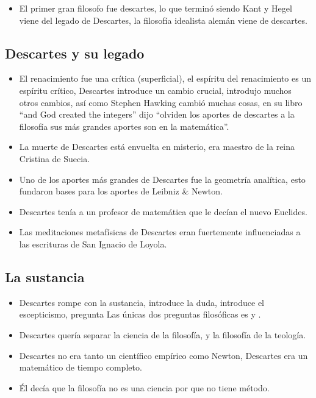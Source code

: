 \begin{itemize}
    \item El primer gran filosofo fue descartes,  lo que terminó siendo Kant y Hegel viene del legado de Descartes, la filosofía idealista alemán viene de descartes. 
\end{itemize}

\subsection{Descartes y su legado}
\begin{itemize}
    \item El renacimiento fue una crítica (superficial), el espíritu del renacimiento es un espíritu crítico, Descartes introduce un cambio crucial, introdujo muchos otros cambios, así como Stephen Hawking cambió muchas cosas, en su libro ``and God created the integers'' dijo ``olviden los aportes de descartes a la filosofía sus más grandes aportes son en la matemática''. 
    \item La muerte de Descartes está envuelta en misterio, era maestro de la reina Cristina de Suecia. 
    \item Uno de los aportes más grandes de Descartes fue la geometría analítica, esto fundaron bases para los aportes de Leibniz \& Newton. 
    \item Descartes tenía a un profesor de matemática que le decían el nuevo Euclides. 
    \item Las meditaciones metafísicas de Descartes eran fuertemente influenciadas a las escrituras de San Ignacio de Loyola. 
\end{itemize}

\subsection{La sustancia}
\begin{itemize}
    \item Descartes rompe con la sustancia, introduce la duda, introduce el escepticismo, pregunta  Las únicas dos preguntas filosóficas es  y .
    \item Descartes quería separar la ciencia de la filosofía, y la filosofía de la teología. 
    \item Descartes no era tanto un científico empírico como Newton, Descartes era un matemático de tiempo completo. 
    \item Él decía que la filosofía no es una ciencia por que no tiene método. 
\end{itemize}

